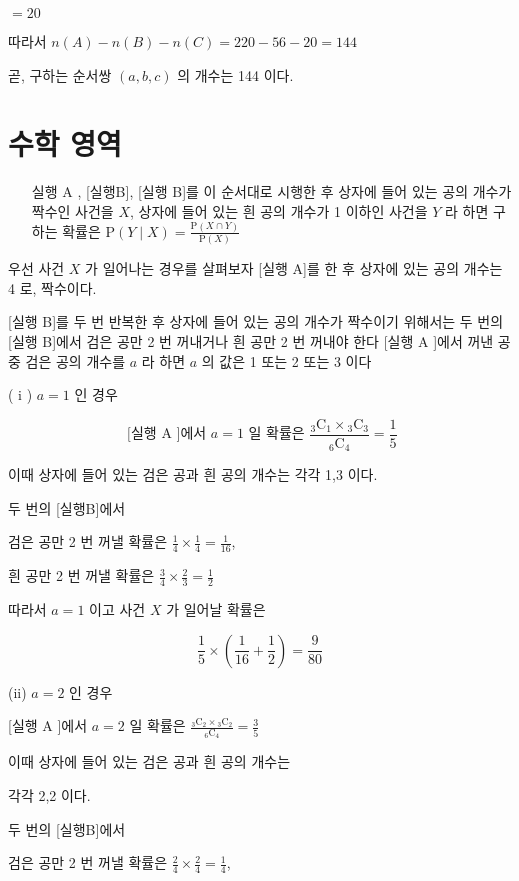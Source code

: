 \documentclass[10pt]{article}
\begin{document}
$=20$

따라서 $n(A)-n(B)-n(C)=220-56-20=144$

곧, 구하는 순서쌍 $(a, b, c)$ 의 개수는 144 이다.

\section*{수학 영역}
\begin{enumerate}
  \setcounter{enumi}{29}
  \item [실행 A], [실행B], [실행 B]를 이 순서대로 시행한 후 상자에 들어 있는 공의 개수가 짝수인 사건을 $X$, 상자에 들어 있는 흰 공의 개수가 1 이하인 사건을 $Y$ 라 하면 구하는 확률은 $\mathrm{P}(Y \mid X)=\frac{\mathrm{P}(X \cap Y)}{\mathrm{P}(X)}$
\end{enumerate}

우선 사건 $X$ 가 일어나는 경우를 살펴보자 [실행 A]를 한 후 상자에 있는 공의 개수는 4 로, 짝수이다.

[실행 B]를 두 번 반복한 후 상자에 들어 있는 공의 개수가 짝수이기 위해서는 두 번의 [실행 B]에서 검은 공만 2 번 꺼내거나 흰 공만 2 번 꺼내야 한다 [실행 A ]에서 꺼낸 공 중 검은 공의 개수를 $a$ 라 하면 $a$ 의 값은 1 또는 2 또는 3 이다

( i ) $a=1$ 인 경우

\[
\text { [실행 } \mathrm{A} \text { ]에서 } a=1 \text { 일 확률은 } \frac{{ }_{3} \mathrm{C}_{1} \times{ }_{3} \mathrm{C}_{3}}{{ }_{6} \mathrm{C}_{4}}=\frac{1}{5}
\]

이때 상자에 들어 있는 검은 공과 흰 공의 개수는 각각 1,3 이다.

두 번의 [실행B]에서

검은 공만 2 번 꺼낼 확률은 $\frac{1}{4} \times \frac{1}{4}=\frac{1}{16}$,

흰 공만 2 번 꺼낼 확률은 $\frac{3}{4} \times \frac{2}{3}=\frac{1}{2}$

따라서 $a=1$ 이고 사건 $X$ 가 일어날 확률은

\[
\frac{1}{5} \times\left(\frac{1}{16}+\frac{1}{2}\right)=\frac{9}{80}
\]

(ii) $a=2$ 인 경우

[실행 A ]에서 $a=2$ 일 확률은 $\frac{{ }_{3} \mathrm{C}_{2} \times{ }_{3} \mathrm{C}_{2}}{{ }_{6} \mathrm{C}_{4}}=\frac{3}{5}$

이때 상자에 들어 있는 검은 공과 흰 공의 개수는

각각 2,2 이다.

두 번의 [실행B]에서

검은 공만 2 번 꺼낼 확률은 $\frac{2}{4} \times \frac{2}{4}=\frac{1}{4}$,
\end{document}
